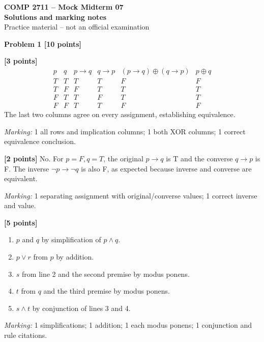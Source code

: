 \documentclass[12pt,letterpaper]{article}
\newcommand{\problemheading}[2][5\baselineskip]{\Needspace{#1}\par\noindent\hspace*{-0.625in}\textbf{#2}\par\nobreak\vspace{0.3em}}
\begin{document}
\begin{center}\textbf{COMP 2711 -- Mock Midterm 07}\\{\large\bfseries Solutions and marking notes}\\Practice material -- not an official examination\end{center}\vspace{0.5em}
\problemheading[\dimexpr 3\baselineskip+4\baselineskip\relax]{Problem 1 [10 points]}
\begin{description}[font=\normalfont,leftmargin=1.2em,labelsep=0.4em]
\item[(a)] \textbf{[3 points]} \[\begin{array}{cc|cc|cc}p&q&p\to q&q\to p&(p\to q)\oplus(q\to p)&p\oplus q\\\hline T&T&T&T&F&F\\T&F&F&T&T&T\\F&T&T&F&T&T\\F&F&T&T&F&F\end{array}\] The last two columns agree on every assignment, establishing equivalence.
\par\textit{Marking:} 1 all rows and implication columns; 1 both XOR columns; 1 correct equivalence conclusion.
\item[(b)] \textbf{[2 points]} No. For $p=F,q=T$, the original $p\to q$ is T and the converse $q\to p$ is F. The inverse $\neg p\to\neg q$ is also F, as expected because inverse and converse are equivalent.
\par\textit{Marking:} 1 separating assignment with original/converse values; 1 correct inverse and value.
\item[(c)] \textbf{[5 points]} \begin{enumerate}\item $p$ and $q$ by simplification of $p\land q$.\item $p\lor r$ from $p$ by addition.\item $s$ from line 2 and the second premise by modus ponens.\item $t$ from $q$ and the third premise by modus ponens.\item $s\land t$ by conjunction of lines 3 and 4.\end{enumerate}
\par\textit{Marking:} 1 simplifications; 1 addition; 1 each modus ponens; 1 conjunction and rule citations.
\end{description}
\vspace{0.65em}
\end{document}
